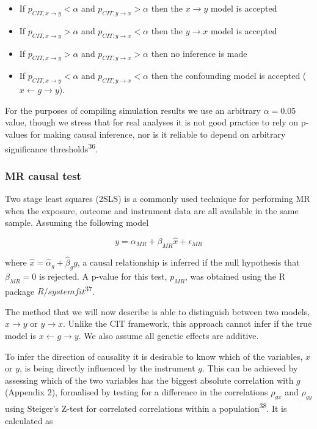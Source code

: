 \documentclass[]{article}
\providecommand{\tightlist}{%
  \setlength{\itemsep}{0pt}\setlength{\parskip}{0pt}}
\begin{document}
\begin{itemize}
\tightlist
\item
  If \(p_{CIT, x \rightarrow y} < \alpha\) and
  \(p_{CIT, y \rightarrow x} > \alpha\) then the \(x \rightarrow y\)
  model is accepted
\item
  If \(p_{CIT, x \rightarrow y} > \alpha\) and
  \(p_{CIT, y \rightarrow x} < \alpha\) then the \(y \rightarrow x\)
  model is accepted
\item
  If \(p_{CIT, x \rightarrow y} > \alpha\) and
  \(p_{CIT, y \rightarrow x} > \alpha\) then no inference is made
\item
  If \(p_{CIT, x \rightarrow y} < \alpha\) and
  \(p_{CIT, y \rightarrow x} < \alpha\) then the confounding model is
  accepted (\(x \leftarrow g \rightarrow y\)).
\end{itemize}

For the purposes of compiling simulation results we use an arbitrary
\(\alpha = 0.05\) value, though we stress that for real analyses it is
not good practice to rely on p-values for making causal inference, nor
is it reliable to depend on arbitrary significance
thresholds\textsuperscript{36}.

\subsubsection{MR causal test}\label{mr-causal-test}

Two stage least squares (2SLS) is a commonly used technique for
performing MR when the exposure, outcome and instrument data are all
available in the same sample. Assuming the following model

\[
y = \alpha_{MR} + \beta_{MR} \hat{x} + \epsilon_{MR}
\]

where \(\hat{x} = \hat{\alpha}_g + \hat{\beta}_g g\), a causal
relationship is inferred if the null hypothesis that \(\beta_{MR} = 0\)
is rejected. A p-value for this test, \(p_{MR}\), was obtained using the
R package \(R/systemfit\)\textsuperscript{37}.

The method that we will now describe is able to distinguish between two
models, \(x \rightarrow y\) or \(y \rightarrow x\). Unlike the CIT
framework, this approach cannot infer if the true model is
\(x \leftarrow g \rightarrow y\). We also assume all genetic effects are
additive.

To infer the direction of causality it is desirable to know which of the
variables, \(x\) or \(y\), is being directly influenced by the
instrument \(g\). This can be achieved by assessing which of the two
variables has the biggest absolute correlation with \(g\) (Appendix 2),
formalised by testing for a difference in the correlations \(\rho_{gx}\)
and \(\rho_{gy}\) using Steiger's Z-test for correlated correlations
within a population\textsuperscript{38}. It is calculated as
\end{document}
